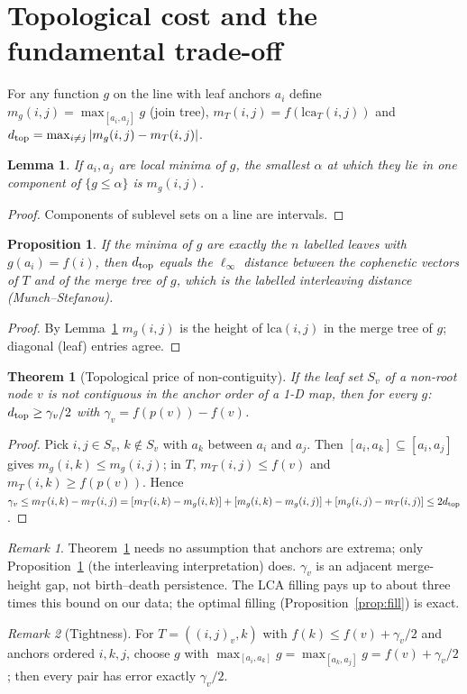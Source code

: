 \documentclass[11pt]{article}
\newtheorem{lemma}{Lemma}\newtheorem{proposition}{Proposition}\newtheorem{theorem}{Theorem}\newtheorem{corollary}{Corollary}
\theoremstyle{remark}\newtheorem{remark}{Remark}
\begin{document}
\section{Topological cost and the fundamental trade-off}
For any function $g$ on the line with leaf anchors $a_i$ define $m_g(i,j)=\max_{[a_i,a_j]}g$ (join tree), $m_T(i,j)=f(\mathrm{lca}_T(i,j))$ and $d_{\rm top}=\max_{i\ne j}|m_g(i,j)-m_T(i,j)|$.
\begin{lemma}\label{lem:1d}If $a_i,a_j$ are local minima of $g$, the smallest $\alpha$ at which they lie in one component of $\{g\le\alpha\}$ is $m_g(i,j)$.\end{lemma}
\begin{proof}Components of sublevel sets on a line are intervals.\end{proof}
\begin{proposition}\label{prop:interleave}If the minima of $g$ are exactly the $n$ labelled leaves with $g(a_i)=f(i)$, then $d_{\rm top}$ equals the $\ell_\infty$ distance between the cophenetic vectors of $T$ and of the merge tree of $g$, which is the labelled interleaving distance (Munch--Stefanou).\end{proposition}
\begin{proof}By Lemma~\ref{lem:1d} $m_g(i,j)$ is the height of $\mathrm{lca}(i,j)$ in the merge tree of $g$; diagonal (leaf) entries agree.\end{proof}

\begin{theorem}[Topological price of non-contiguity]\label{thm:price}
If the leaf set $S_v$ of a non-root node $v$ is not contiguous in the anchor order of a 1-D map, then for every $g$: $d_{\rm top}\ge\gamma_v/2$ with $\gamma_v=f(p(v))-f(v)$.
\end{theorem}
\begin{proof}Pick $i,j\in S_v$, $k\notin S_v$ with $a_k$ between $a_i$ and $a_j$. Then $[a_i,a_k]\subseteq[a_i,a_j]$ gives $m_g(i,k)\le m_g(i,j)$; in $T$, $m_T(i,j)\le f(v)$ and $m_T(i,k)\ge f(p(v))$. Hence
$\gamma_v\le m_T(i,k)-m_T(i,j)=[m_T(i,k)-m_g(i,k)]+[m_g(i,k)-m_g(i,j)]+[m_g(i,j)-m_T(i,j)]\le 2d_{\rm top}$.\end{proof}
\begin{remark}Theorem~\ref{thm:price} needs no assumption that anchors are extrema; only Proposition~\ref{prop:interleave} (the interleaving interpretation) does. $\gamma_v$ is an adjacent merge-height gap, not birth--death persistence. The LCA filling pays up to about three times this bound on our data; the optimal filling (Proposition~\ref{prop:fill}) is exact.\end{remark}
\begin{remark}[Tightness]For $T=((i,j)_v,k)$ with $f(k)\le f(v)+\gamma_v/2$ and anchors ordered $i,k,j$, choose $g$ with $\max_{[a_i,a_k]}g=\max_{[a_k,a_j]}g=f(v)+\gamma_v/2$; then every pair has error exactly $\gamma_v/2$.\end{remark}
\end{document}
